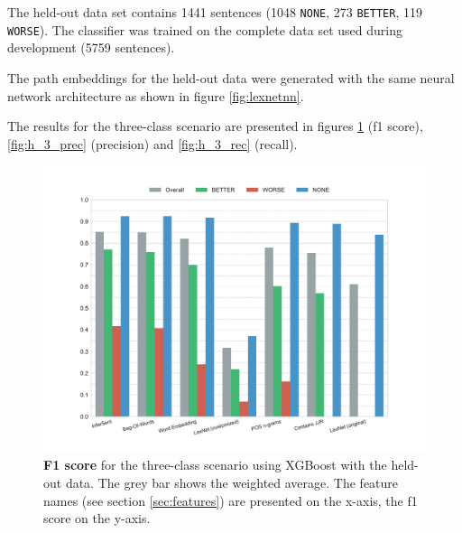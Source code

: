 The held-out data set contains 1441 sentences (1048 \texttt{NONE}, 273 \texttt{BETTER}, 119 \texttt{WORSE}). The classifier was trained on the complete data set used during development (5759 sentences).

The path embeddings for the held-out data were generated with the same neural network architecture as shown in figure \ref{fig:lexnetnn}.

The results for the three-class scenario are presented in figures \ref{fig:h_3_f1} (f1 score), \ref{fig:h_3_prec} (precision) and \ref{fig:h_3_rec} (recall).


\begin{figure}[htbp]
         \caption{\textbf{F1 score} for the three-class scenario using XGBoost with the held-out data. The grey bar shows the weighted average. The feature names (see section \ref{sec:features}) are presented on the x-axis, the f1 score on the y-axis.} 
    \label{fig:h_3_f1}
    \centering
	\includegraphics[width=1\linewidth]{images/heldout/h-f1-False}
    \end{figure}
    


